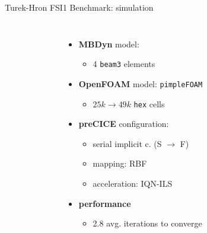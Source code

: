 \documentclass[10pt,t]{beamer}
\begin{document}
\begin{frame}{Turek-Hron FSI1 Benchmark: simulation}
\begin{columns}
\begin{figure}
    
    
\end{figure}



\footnotesize
\begin{itemize}
    \itemsep 10pt
    \item \textbf{MBDyn} model:
    \begin{itemize}
        \item 4 \texttt{beam3} elements
    \end{itemize}
    
    \item \textbf{OpenFOAM} model: \texttt{pimpleFOAM}
    \begin{itemize}
        \item $25k \to 49k$ \texttt{hex} cells
    \end{itemize}
    \item \textbf{preCICE} configuration:
    \begin{itemize}
        \item serial implicit c. (S $\to$ F)
        \item mapping: RBF
        \item acceleration: IQN-ILS
    \end{itemize}
    \item \textbf{performance}
    \begin{itemize}
        \item 2.8 avg. iterations to converge
    \end{itemize}
\end{itemize}

\end{columns}

\end{frame}
\end{document}
